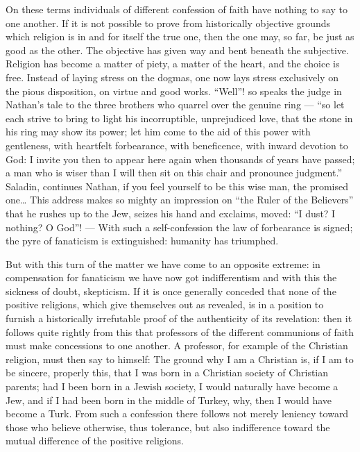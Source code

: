 \documentclass[12pt,a4paper,openany]{book}
\newcommand{\opage}[1]{\marginnote{\footnotesize\textit{[#1]}}}
\begin{document}
On these terms individuals of different
confession of faith have nothing to say to one another. If it
is not possible to prove from historically objective grounds
\setcounter{footnote}{0}%
\opage{611}which religion is in and for itself the true one, then
the one may, so far, be just as good as the other.
The objective has given way and bent beneath the
subjective. Religion has become a matter of piety,
a matter of the heart, and the choice is free. Instead of laying stress
on the dogmas, one now lays stress exclusively on
the pious disposition, on virtue and good works.
``Well''! so speaks the judge in Nathan's tale to
the three brothers who quarrel over the genuine ring --- ``so let
each strive to bring to light his incorruptible, unprejudiced
love, that the stone in his ring may show
its power; let him come to the aid of this power with gentleness,
with heartfelt forbearance, with beneficence,
with inward devotion to God: I invite
you then to appear here again when thousands of years have
passed; a man who is wiser than I will then sit
on this chair and pronounce judgment.'' Saladin, continues
Nathan, if you feel yourself to be this wise man,
the promised one\dots{} This address makes so mighty an
impression on ``the Ruler of the Believers'' that he rushes
up to the Jew, seizes his hand and exclaims, moved:
``I dust? I nothing? O God''! --- With such
a self-confession the law of forbearance is signed;
the pyre of fanaticism is extinguished: humanity has triumphed.

But with this turn of the matter we have come to
an opposite extreme: in compensation for fanaticism
we have now got indifferentism and with this the sickness of doubt,
skepticism. If it is once generally conceded
that none of the positive religions, which give themselves out
as revealed, is in a position to furnish a historically irrefutable
proof of the authenticity of its revelation: then it follows
\setcounter{footnote}{0}%
\opage{612}quite rightly from this that professors of the different communions of faith
must make concessions to one another. A professor,
for example of the Christian religion, must then say to himself:
The ground why I am a Christian is, if I am to
be sincere, properly this, that I was born in a Christian
society of Christian parents; had I been born in a
Jewish society, I would naturally have become a Jew, and
if I had been born in the middle of Turkey, why, then I would have
become a Turk. From such a confession there follows not merely
leniency toward those who believe otherwise, thus tolerance,
but also indifference toward the mutual difference
of the positive religions.
\end{document}
